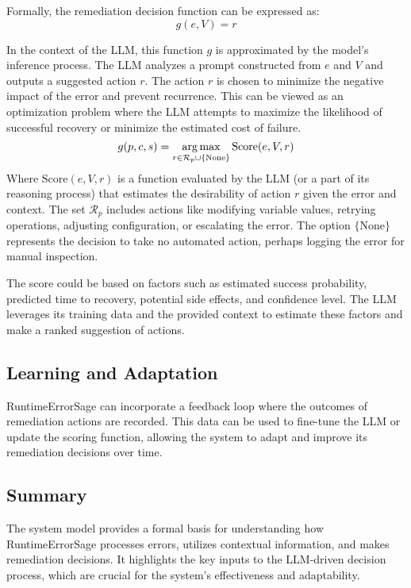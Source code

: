 Formally, the remediation decision function can be expressed as:
\begin{equation}
\label{eq:remediation-decision}
g(e, V) = r
\end{equation}

In the context of the LLM, this function $g$ is approximated by the model's inference process. The LLM analyzes a prompt constructed from $e$ and $V$ and outputs a suggested action $r$. The action $r$ is chosen to minimize the negative impact of the error and prevent recurrence. This can be viewed as an optimization problem where the LLM attempts to maximize the likelihood of successful recovery or minimize the estimated cost of failure.
\begin{equation}
\label{eq:argmax}
g(p,c,s) = \operatorname*{arg\,max}_{r \in \mathcal{R}_p \cup \{\text{None}\}} \text{Score}(e, V, r)
\end{equation}
Where $\text{Score}(e, V, r)$ is a function evaluated by the LLM (or a part of its reasoning process) that estimates the desirability of action $r$ given the error and context. The set $\mathcal{R}_p$ includes actions like modifying variable values, retrying operations, adjusting configuration, or escalating the error. The option $\{\text{None}\}$ represents the decision to take no automated action, perhaps logging the error for manual inspection.\cite{runtime_safety_analysis_2018}

The score could be based on factors such as estimated success probability, predicted time to recovery, potential side effects, and confidence level. The LLM leverages its training data and the provided context to estimate these factors and make a ranked suggestion of actions.
\subsection{Learning and Adaptation}
RuntimeErrorSage can incorporate a feedback loop where the outcomes of remediation actions are recorded. This data can be used to fine-tune the LLM or update the scoring function, allowing the system to adapt and improve its remediation decisions over time.

\subsection{Summary}
The system model provides a formal basis for understanding how RuntimeErrorSage processes errors, utilizes contextual information, and makes remediation decisions. It highlights the key inputs to the LLM-driven decision process, which are crucial for the system's effectiveness and adaptability.